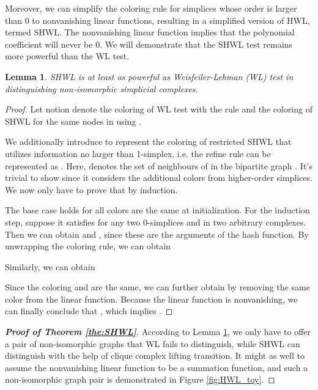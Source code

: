 \documentclass[letterpaper]{article} \usepackage{aaai24}
\theoremstyle{plain}
\newtheorem{lemma}[theorem]{Lemma}
\theoremstyle{definition}
\theoremstyle{remark}
\begin{document}
Moreover, we can simplify the coloring rule for simplices whose order is larger than 0 to nonvanishing linear functions, resulting in a simplified version of HWL, termed SHWL. 
The nonvanishing linear function implies that the polynomial coefficient will never be 0. 
We will demonstrate that the SHWL test remains more powerful than the WL test.

\begin{lemma}
\label{lemma:SHWL}
SHWL is at least as powerful as Weisfeiler-Lehman (WL) test in distinguishing non-isomorphic simplicial complexes.
\end{lemma}

\begin{proof} 
\label{proof:SHWL}
Let notion  denote the coloring of WL test with the rule    and  the coloring of SHWL for the same nodes in  using  .

We additionally introduce  to represent the coloring of restricted SHWL that utilizes information no larger than 1-simplex, i.e. the refine rule can be represented as . Here,  denotes the set of neighbours of  in the bipartite graph .  It's trivial to show  since it considers the additional colors from higher-order simplices. We now only have to prove that  by induction.

The base case holds for all colors are the same at initialization.
 For the induction step, suppose it satisfies  for any two 0-simplices  and  in two arbitrary complexes. Then we can obtain  and , since these are the arguments of the hash function.  By unwrapping the coloring rule, we can obtain
 

Similarly, we can obtain 


Since the coloring  and  are the same, we can further obtain   by removing the same color from the linear function. Because the linear function is nonvanishing, we can finally conclude that , which implies .
\end{proof}

\begin{proof} [\textbf{Proof of Theorem \ref{the:SHWL}}]
According to Lemma \ref{lemma:SHWL}, we only have to offer a pair of non-isomorphic graphs that WL fails to distinguish, while SHWL can distinguish with the help of clique complex lifting transition. It might as well to assume the nonvanishing linear function to be a summation function, and such a non-isomorphic graph pair is demonstrated in Figure \ref{fig:HWL_toy}.
\end{proof}
\end{document}
